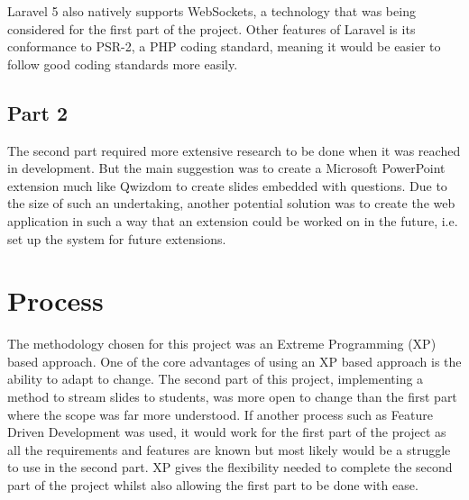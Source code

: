 Laravel 5 also natively supports WebSockets, a technology that was being considered for the first part of the project. Other features of Laravel is its conformance to PSR-2, a PHP coding standard, meaning it would be easier to follow good coding standards more easily.
\subsection{Part 2}
The second part required more extensive research to be done when it was reached in development. But the main suggestion was to create a Microsoft PowerPoint extension much like Qwizdom to create slides embedded with questions\cite{powerpoint-addins}. Due to the size of such an undertaking, another potential solution was to create the web application in such a way that an extension could be worked on in the future, i.e. set up the system for future extensions.
\newpage

\section{Process}
The methodology chosen for this project was an Extreme Programming\cite{xp} (XP) based approach. One of the core advantages of using an XP based approach is the ability to adapt to change. The second part of this project, implementing a method to stream slides to students, was more open to change than the first part where the scope was far more understood. If another process such as Feature Driven Development was used, it would work for the first part of the project as all the requirements and features are known but most likely would be a struggle to use in the second part. XP gives the flexibility needed to complete the second part of the project whilst also allowing the first part to be done with ease.

